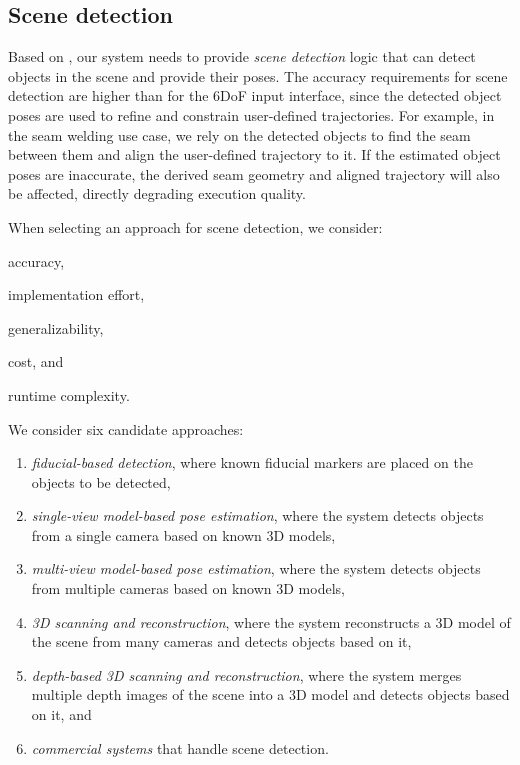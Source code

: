 \subsection{Scene detection} \label{subsec:ch2_analysis_scene_detection}

Based on , our system needs to provide \emph{scene detection} logic that can detect objects in the scene and provide their poses. The accuracy requirements for scene detection are higher than for the 6DoF input interface, since the detected object poses are used to refine and constrain user-defined trajectories. For example, in the seam welding use case, we rely on the detected objects to find the seam between them and align the user-defined trajectory to it. If the estimated object poses are inaccurate, the derived seam geometry and aligned trajectory will also be affected, directly degrading execution quality.

When selecting an approach for scene detection, we consider:
\begin{enumerate*}[label=(\roman*)]
    \item accuracy,
    \item implementation effort,
    \item generalizability,
    \item cost, and
    \item runtime complexity.
\end{enumerate*}

We consider six candidate approaches:
\begin{enumerate}[label=(\roman*)]
    \item \emph{fiducial-based detection}, where known fiducial markers are placed on the objects to be detected,
    \item \emph{single-view model-based pose estimation}, where the system detects objects from a single camera based on known 3D models, \label{req:single_view_model_based_pose_estimation}
    \item \emph{multi-view model-based pose estimation}, where the system detects objects from multiple cameras based on known 3D models, \label{req:multi_view_model_based_pose_estimation}
    \item \emph{3D scanning and reconstruction}, where the system reconstructs a 3D model of the scene from many cameras and detects objects based on it, \label{req:3D_scanning_and_reconstruction}
    \item \emph{depth-based 3D scanning and reconstruction}, where the system merges multiple depth images of the scene into a 3D model and detects objects based on it, and \label{req:depth_based_3D_scanning_and_reconstruction}
    \item \emph{commercial systems} that handle scene detection.
\end{enumerate}

